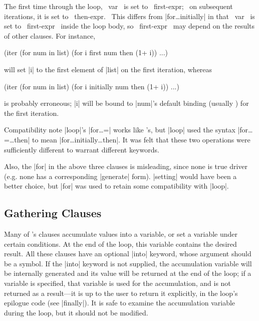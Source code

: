 \begin{clauses}
The first time through the loop, ~var~ is set to ~first-expr;~ on
subsequent iterations, it is set to ~then-expr.~  This differs from
|for\dots initially| in that ~var~ is set to ~first-expr~
inside the loop body,
so ~first-expr~ may depend on the results of other clauses.  For
instance,
\begin{program}
(iter (for num in list)
      (for i first num then (1+ i))
      ...)
\end{program}
will set |i| to the first element of |list| on the first
iteration, whereas
\begin{program}
(iter (for num in list)
      (for i initially num then (1+ i))
      ...)
\end{program}
is probably erroneous; |i| will be bound to |num|'s
default binding (usually \nil) for the first iteration.

\end{clauses}

\begin{note}{Compatibility note}
|loop|'s |for\dots =| works like \iter's, but |loop| used the syntax
|for\dots =\dots then| to mean |for\dots initially\dots then|.  It was
felt that these two operations were sufficiently different to warrant
different keywords.

Also, the |for| in the above three clauses is misleading,
since none is true driver (e.g. none has a corresponding |generate|
form).  |setting| would have been a better choice, but |for| was used
to retain some compatibility with |loop|.
\end{note}


\subsection{Gathering Clauses}
Many of \iter's clauses accumulate values into a variable, or set a
variable under certain conditions.  At the end of the loop, this
variable contains the desired result.  All these clauses have an
optional |into| keyword, whose argument should be a symbol.  If the
|into| keyword is not supplied, the accumulation variable will be
internally generated and its value will be returned at the end of the
loop; if a variable is specified, that variable is used for the
accumulation, and is not returned as a result---it is up to the user
to return it explicitly, in the loop's epilogue code (see |finally|).
It is safe to examine the accumulation variable during the loop, but
it should not be modified.

